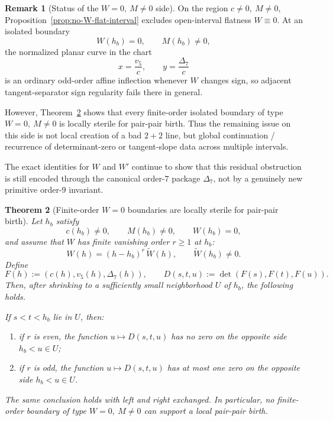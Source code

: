 \documentclass[11pt,a4paper]{amsart}
\theoremstyle{plain}
\newtheorem{theorem}{Theorem}[section]
\theoremstyle{definition}
\newtheorem{remark}[theorem]{Remark}
\begin{document}
\begin{remark}[Status of the $W=0,\ M\neq 0$ side]
\label{rem:audit-w0-affine-inflection}
On the region $c\neq 0,\ M\neq 0$, Proposition~\ref{prop:no-W-flat-interval}
excludes open-interval flatness $W\equiv 0$. At an isolated boundary
\[
W(h_b)=0,\qquad M(h_b)\neq 0,
\]
the normalized planar curve in the chart
\[
x=\frac{v_5}{c},
\qquad
y=\frac{\Delta_7}{c}
\]
is an ordinary odd-order affine inflection whenever $W$ changes sign, so
adjacent tangent-separator sign regularity fails there in general.

However, Theorem~\ref{thm:finite-order-w-zero-local-sterility} shows that every
finite-order isolated boundary of type $W=0,\ M\neq 0$ is locally sterile for
pair-pair birth. Thus the remaining issue on this side is not local creation of
a bad $2+2$ line, but global continuation / recurrence of determinant-zero or
tangent-slope data across multiple intervals.

The exact identities for $W$ and $W'$ continue to show that this residual
obstruction is still encoded through the canonical order-$7$ package
$\Delta_7$, not by a genuinely new primitive order-$9$ invariant.
\end{remark}

\begin{theorem}[Finite-order $W=0$ boundaries are locally sterile for pair-pair birth]
\label{thm:finite-order-w-zero-local-sterility}
Let $h_b$ satisfy
\[
c(h_b)\neq 0,
\qquad
M(h_b)\neq 0,
\qquad
W(h_b)=0,
\]
and assume that $W$ has finite vanishing order $r\ge 1$ at $h_b$:
\[
W(h)=(h-h_b)^r\,\widetilde W(h),
\qquad
\widetilde W(h_b)\neq 0.
\]
Define
\[
F(h):=(c(h),v_5(h),\Delta_7(h)),
\qquad
D(s,t,u):=\det(F(s),F(t),F(u)).
\]
Then, after shrinking to a sufficiently small neighborhood $U$ of $h_b$,
the following holds.

If $s<t<h_b$ lie in $U$, then:
\begin{enumerate}
\item if $r$ is even, the function $u\mapsto D(s,t,u)$ has no zero on the
opposite side $h_b<u\in U$;
\item if $r$ is odd, the function $u\mapsto D(s,t,u)$ has at most one zero on
the opposite side $h_b<u\in U$.
\end{enumerate}
The same conclusion holds with left and right exchanged. In particular, no
finite-order boundary of type $W=0,\ M\neq 0$ can support a local pair-pair
birth.
\end{theorem}
\end{document}
